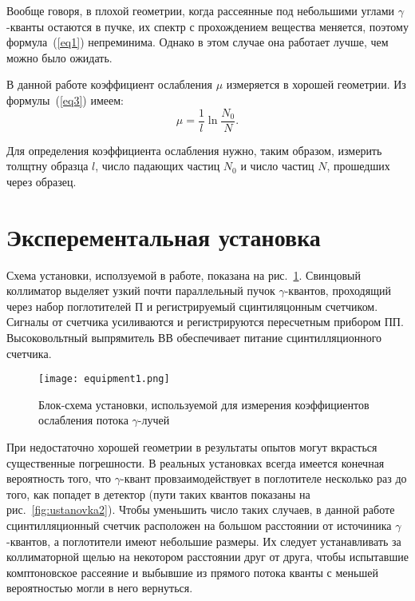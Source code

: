 	Вообще говоря, в плохой геометрии, когда рассеянные под небольшими углами $\gamma$-кванты остаются в пучке, их спектр с прохождением вещества меняется, поэтому формула~(\ref{eq1}) непреминима. Однако в этом случае она работает лучше, чем можно было ожидать.
	
	В данной работе коэффициент ослабления $\mu$ измеряется в хорошей геометрии. Из формулы~(\ref{eq3}) имеем:
	\begin{equation} \label{formula}
		\mu = \frac{1}{l} \ln \frac{N_0}{N}.
	\end{equation}

	Для определения коэффициента ослабления нужно, таким образом, измерить толщтну образца $l$, число падающих частиц $N_0$ и число частиц $N$, прошедших через образец.

    \section*{Эксперементальная установка}

    Схема установки, исползуемой в работе, показана на рис.~\ref{fig:ustanovka1}. Свинцовый коллиматор выделяет узкий почти параллельный пучок $\gamma$-квантов, проходящий через набор поглотителей П и регистрируемый сцинтиляцонным счетчиком. Сигналы от счетчика усиливаются и регистрируются пересчетным прибором ПП. Высоковольтный выпрямитель ВВ обеспечивает питание сцинтилляционного счетчика.
	

    \begin{figure}
        \centering
        \texttt{[image: equipment1.png]}
        \caption{Блок-схема установки, используемой для измерения коэффициентов ослабления потока $\gamma$-лучей}
        \label{fig:ustanovka1}
    \end{figure}

    При недостаточно хорошей геометрии в результаты опытов могут вкрасться существенные погрешности. В реальных установках всегда имеется конечная вероятность того, что $\gamma$-квант провзаимодействует в поглотителе несколько раз до того, как попадет в детектор (пути таких квантов показаны на рис.~\ref{fig:ustanovka2}). Чтобы уменьшить число таких случаев, в данной работе сцинтилляционный счетчик расположен на большом расстоянии от источиника $\gamma$-квантов, а поглотители имеют небольшие размеры. Их следует устанавливать за коллиматорной щелью на некотором расстоянии друг от друга, чтобы испытавшие комптоновское рассеяние и выбывшие из прямого потока кванты с меньшей вероятностью могли в него вернуться.

